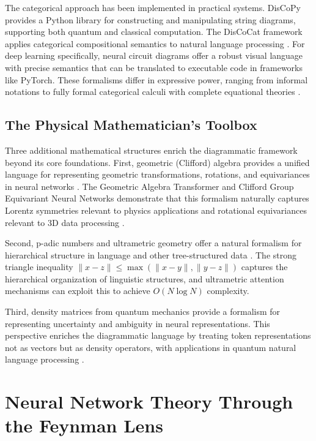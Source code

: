 \documentclass[12pt,a4paper]{article}
\begin{document}
The categorical approach has been implemented in practical systems. DisCoPy \cite{toumi2022discopy} provides a Python library for constructing and manipulating string diagrams, supporting both quantum and classical computation. The DisCoCat framework applies categorical compositional semantics to natural language processing \cite{sadrzadeh2016quantifier, kartsaklis2016coordination}. For deep learning specifically, neural circuit diagrams \cite{abbott2024neural} offer a robust visual language with precise semantics that can be translated to executable code in frameworks like PyTorch. These formalisms differ in expressive power, ranging from informal notations to fully formal categorical calculi with complete equational theories \cite{bonchi2020stringdr, bonchi2021stringdr}.

\subsection{The Physical Mathematician's Toolbox}

Three additional mathematical structures enrich the diagrammatic framework beyond its core foundations. First, geometric (Clifford) algebra provides a unified language for representing geometric transformations, rotations, and equivariances in neural networks \cite{ruhe2023geometric}. The Geometric Algebra Transformer and Clifford Group Equivariant Neural Networks demonstrate that this formalism naturally captures Lorentz symmetries relevant to physics applications and rotational equivariances relevant to 3D data processing \cite{spinner2024lorentzequivariant, brehmer2024a}. 

Second, p-adic numbers and ultrametric geometry offer a natural formalism for hierarchical structure in language and other tree-structured data \cite{murtagh2008from}. The strong triangle inequality $\|x - z\| \leq \max(\|x - y\|, \|y - z\|)$ captures the hierarchical organization of linguistic structures, and ultrametric attention mechanisms can exploit this to achieve $O(N \log N)$ complexity.

Third, density matrices from quantum mechanics provide a formalism for representing uncertainty and ambiguity in neural representations. This perspective enriches the diagrammatic language by treating token representations not as vectors but as density operators, with applications in quantum natural language processing \cite{meichanetzidis2021quantum}.

\section{Neural Network Theory Through the Feynman Lens}
\end{document}
